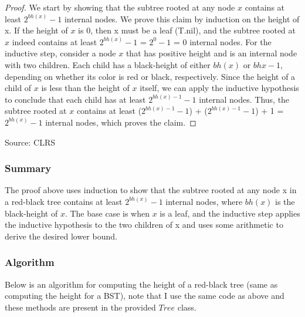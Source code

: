 \documentclass[10pt]{article}
\begin{document}
  \begin{proof}
    We start by showing that the subtree rooted at any node $x$ contains at least
    $2^{bh(x)}- 1$ internal nodes. We prove this claim by induction on the
    height of x. If the height of $x$ is 0, then x must be a leaf (T.nil), and the
    subtree rooted at $x$ indeed contains at least $2^{bh(x)}- 1$ = $2^{0}- 1$ =
    0 internal nodes. For the inductive step, consider a node $x$ that has positive
    height and is an internal node with two children. Each child has a black-height
    of either $bh(x)$ or $bhx - 1$, depending on whether its color is red or black,
    respectively. Since the height of a child of $x$ is less than the height of $x$
    itself, we can apply the inductive hypothesis to conclude that each child
    has at least $2^{bh(x) - 1}- 1$ internal nodes. Thus, the subtree rooted at
    $x$ contains at least ($2^{bh(x) - 1}- 1$) + ($2^{bh(x) - 1}- 1$) + 1 =
    $2^{bh(x)}- 1$ internal nodes, which proves the claim.
  \end{proof}

  \noindent
  Source: CLRS

  \subsubsection*{Summary}


  The proof above uses induction to show that the subtree rooted at any node x
  in a red-black tree contains at least $2^{bh(x)}- 1$ internal nodes, where $bh(
  x)$ is the black-height of $x$. The base case is when $x$ is a leaf, and the inductive
  step applies the inductive hypothesis to the two children of x and uses some arithmetic
  to derive the desired lower bound.

  \subsubsection*{Algorithm}


  Below is an algorithm for computing the height of a red-black tree (same as
  computing the height for a BST), note that I use the same code as above and
  these methods are present in the provided $Tree$ class.
\end{document}
